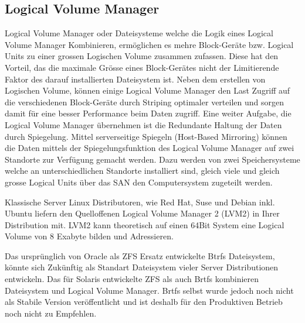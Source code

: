 \subsection{Logical Volume Manager}
Logical Volume Manager oder Dateisysteme welche die Logik eines Logical Volume Manager Kombinieren, ermöglichen es mehre Block-Geräte bzw. Logical Units zu einer grossen Logischen Volume zusammen zufassen. Diese hat den Vorteil, das die maximale Grösse eines Block-Gerätes nicht der Limitierende Faktor des darauf installierten Dateisystem ist. Neben dem erstellen von Logischen Volume, können einige Logical Volume Manager den Last Zugriff auf die verschiedenen Block-Geräte durch Striping optimaler verteilen und sorgen damit für eine besser Performance beim Daten zugriff. Eine weiter Aufgabe, die Logical Volume Manager übernehmen ist die Redundante Haltung der Daten durch Spiegelung.  Mittel serverseitige Spiegeln (Host-Based Mirroring) können die Daten mittels der Spiegelungsfunktion des Logical Volume Manager auf zwei Standorte zur Verfügung gemacht werden. Dazu werden von zwei Speichersysteme welche an unterschiedlichen Standorte installiert sind, gleich viele und gleich grosse Logical Units über das SAN den Computersystem zugeteilt werden.

Klassische Server Linux Distributoren, wie Red Hat, Suse und Debian inkl. Ubuntu liefern den Quelloffenen Logical Volume Manager 2 (LVM2) in Ihrer Distribution mit. LVM2 kann theoretisch auf einen 64Bit System eine Logical Volume von 8 Exabyte bilden und Adressieren.\cite{Levine2009}

Das ursprünglich von Oracle als ZFS Ersatz entwickelte Btrfs Dateisystem, könnte sich Zukünftig als Standart Dateisystem vieler Server Distributionen entwickeln. Das für Solaris entwickelte ZFS als auch Brtfs kombinieren Dateisystem und Logical Volume Manager. Brtfs selbst wurde jedoch noch nicht als Stabile Version veröffentlicht und ist deshalb für den Produktiven Betrieb noch nicht zu Empfehlen.\cite{Redler2011}


